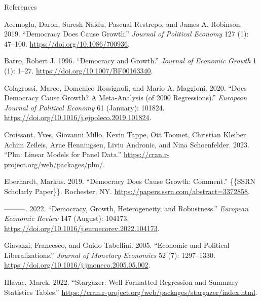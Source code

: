 \documentclass[
  ignorenonframetext,
]{beamer}
\newlength{\cslhangindent}
\newlength{\cslentryspacingunit} %
\newenvironment{CSLReferences}[2] %
 {%
  \setlength{\parindent}{0pt}
  \ifodd #1
  \let\oldpar\par
  \def\par{\hangindent=\cslhangindent\oldpar}
  \fi
  \setlength{\parskip}{#2\cslentryspacingunit}
 }%
 {}
\begin{document}
\begin{frame}{References}
\protect\hypertarget{references}{}
\tiny

\hypertarget{refs}{}
\begin{CSLReferences}{1}{0}
\leavevmode{}%
Acemoglu, Daron, Suresh Naidu, Pascual Restrepo, and James A. Robinson.
2019. {``Democracy {Does Cause Growth}.''} \emph{Journal of Political
Economy} 127 (1): 47--100. \url{https://doi.org/10.1086/700936}.

\leavevmode{}%
Barro, Robert J. 1996. {``Democracy and Growth.''} \emph{Journal of
Economic Growth} 1 (1): 1--27. \url{https://doi.org/10.1007/BF00163340}.

\leavevmode{}%
Colagrossi, Marco, Domenico Rossignoli, and Mario A. Maggioni. 2020.
{``Does Democracy Cause Growth? {A} Meta-Analysis (of 2000
Regressions).''} \emph{European Journal of Political Economy} 61
(January): 101824. \url{https://doi.org/10.1016/j.ejpoleco.2019.101824}.

\leavevmode{}%
Croissant, Yves, Giovanni Millo, Kevin Tappe, Ott Toomet, Christian
Kleiber, Achim Zeileis, Arne Henningsen, Liviu Andronic, and Nina
Schoenfelder. 2023. {``Plm: {Linear Models} for {Panel Data}.''}
\url{https://cran.r-project.org/web/packages/plm/}.

\leavevmode{}%
Eberhardt, Markus. 2019. {``Democracy {Does Cause Growth}: {Comment}.''}
\{\{SSRN Scholarly Paper\}\}. {Rochester, NY}.
\url{https://papers.ssrn.com/abstract=3372858}.

\leavevmode{}%
---------. 2022. {``Democracy, Growth, Heterogeneity, and Robustness.''}
\emph{European Economic Review} 147 (August): 104173.
\url{https://doi.org/10.1016/j.euroecorev.2022.104173}.

\leavevmode{}%
Giavazzi, Francesco, and Guido Tabellini. 2005. {``Economic and
Political Liberalizations.''} \emph{Journal of Monetary Economics} 52
(7): 1297--1330. \url{https://doi.org/10.1016/j.jmoneco.2005.05.002}.

\leavevmode{}%
Hlavac, Marek. 2022. {``Stargazer: {Well-Formatted Regression} and
{Summary Statistics Tables}.''}
\url{https://cran.r-project.org/web/packages/stargazer/index.html}.


\end{CSLReferences}
\end{frame}
\end{document}
